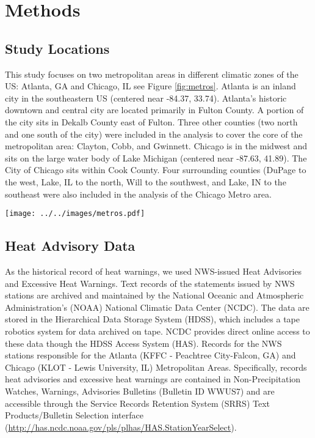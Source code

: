 \documentclass{ametsoc}
\begin{document}
\section{Methods}\label{section:methods}
\subsection{Study Locations}\label{subsec:locations}
This study focuses on two metropolitan areas in different climatic zones of the US: Atlanta, GA and Chicago, IL see Figure \ref{fig:metros}. Atlanta is an inland city in the southeastern US (centered near -84.37, 33.74). Atlanta's historic downtown and central city are located primarily in Fulton County. A portion of the city sits in Dekalb County east of Fulton. Three other counties (two north and one south of the city) were included in the analysis to cover the core of the metropolitan area: Clayton, Cobb, and Gwinnett. Chicago is in the midwest and sits on the large water body of Lake Michigan (centered near -87.63, 41.89).  The City of Chicago sits within Cook County. Four surrounding counties (DuPage to the west, Lake, IL to the north, Will to the southwest, and Lake, IN to the southeast were also included in the analysis of the Chicago Metro area. 


 \noindent\texttt{[image: ../../images/metros.pdf]}
   \label{fig:metros}


\subsection{Heat Advisory Data}\label{subsec:NWSdata}
As the historical record of heat warnings, we used NWS-issued Heat Advisories and Excessive Heat Warnings. Text records of the statements issued by NWS stations are archived and maintained by the National Oceanic and Atmospheric Administration's (NOAA) National Climatic Data Center (NCDC). The data are stored in the Hierarchical Data Storage System (HDSS), which includes a tape robotics system for data archived on tape. NCDC provides direct online access to these data though the HDSS Access System (HAS). Records for the NWS stations responsible for the Atlanta (KFFC - Peachtree City-Falcon, GA) and Chicago (KLOT - Lewis University, IL) Metropolitan Areas. Specifically, records heat advisories and excessive heat warnings are contained in Non-Precipitation Watches, Warnings, Advisories Bulletins (Bulletin ID WWUS7) and are accessible through the Service Records Retention System (SRRS) Text Products/Bulletin Selection interface (\url{http://has.ncdc.noaa.gov/pls/plhas/HAS.StationYearSelect}).
\end{document}
